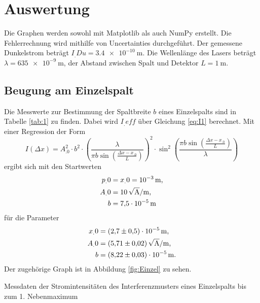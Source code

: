 \section{Auswertung}
\label{sec:Auswertung}


Die Graphen werden sowohl mit Matplotlib \cite{matplotlib} als auch NumPy \cite{numpy} erstellt. Die Fehlerrechnung wird mithilfe von Uncertainties \cite{uncertainties} 
durchgeführt.
\newline\newline
Der gemessene Dunkelstrom beträgt $I_.{Du}=\SI{3,4e-10}{\metre}$.
Die Wellenlänge des Lasers beträgt $\lambda = \SI{635e-9}{\metre}$, der Abstand zwischen Spalt und Detektor $L=\SI{1}{\metre}$.
\subsection{Beugung am Einzelspalt}

Die Messwerte zur Bestimmung der Spaltbreite $b$ eines Einzelspalts sind in Tabelle \ref{tab:1} zu finden. Dabei wird $I_.{eff}$ über Gleichung \eqref{eq:I1} berechnet.
Mit einer Regression der Form 
\[
I(\Delta x)=A^2_.0\cdot b^2\cdot\left(
\frac{\lambda}{\pi b \sin{\left(\frac{\Delta x-x_.0}{L}\right)}}\right)^2\cdot\sin^2{\left(\frac{\pi b\sin{\left(\frac{\Delta x-x_.0}{L}\right)}}{\lambda}\right)}
\]
ergibt sich mit den Startwerten
\begin{align*}
p_.0 	&= x_.0=\SI{e-3}{\metre}\text{,}\\
A_.0	&=\SI{10}{\sqrt{\ampere}\per\metre}\text{,}\\
b		&=\SI{7,5e-5}{\metre}\\
\end{align*}
für die Parameter
\begin{align*}
x_.0&= \SI{2,7(5)e-5}{\metre}\text{,} \\
A_.0&= \SI{5,71(2)}{\sqrt{\ampere}\per\metre}\text{,} \\
b   &= \SI{8,22(3)e-5}{\metre}\text{.} \\
\end{align*}
Der zugehörige Graph ist in Abbildung \ref{fig:Einzel} zu sehen.

\begin{table}
\caption{Messdaten der Stromintensitäten des Interferenzmusters eines Einzelspalts bis zum 1. Nebenmaximum}


\label{tab:1}
\end{table}

